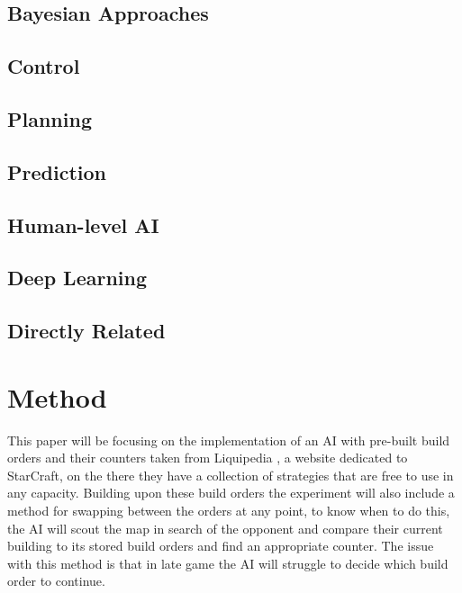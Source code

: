 \documentclass[journal]{IEEEtran}
\begin{document}
 
\subsection{Bayesian Approaches}

\cite{UnitsControl}
\cite{Bayesian}
\cite{SpecialTactics}

\subsection{Control}
\cite{SOMA}
\cite{EffectiveMicro}
\cite{Swarm}
\cite{MM}

\subsection{Planning}
\cite{BuildOrder}
\cite{OnlineEvo}
\cite{GoalDriven}
\cite{Swen}
\cite{POSH}
\cite{Hierarchical}

\subsection{Prediction}
\cite{DataMine}
\cite{Bayesian}
\cite{Scouting}
\cite{ReplayPred}

\subsection{Human-level AI}
\cite{EvalHuman}
\cite{MM}

\subsection{Deep Learning}
\cite{Deep}

\subsection{Directly Related}
\cite{Fuzzy}
\cite{Agents}

\section{Method}
This paper will be focusing on the implementation of an AI with pre-built build orders and their counters taken from Liquipedia \cite{Liquid}, a website dedicated to StarCraft, on the there they have a collection of strategies that are free to use in any capacity. Building upon these build orders the experiment will also include a method for swapping between the orders at any point, to know when to do this, the AI will scout the map in search of the opponent and compare their current building to its stored build orders and find an appropriate counter. The issue with this method is that in late game the AI will struggle to decide which build order to continue. 
\end{document}
